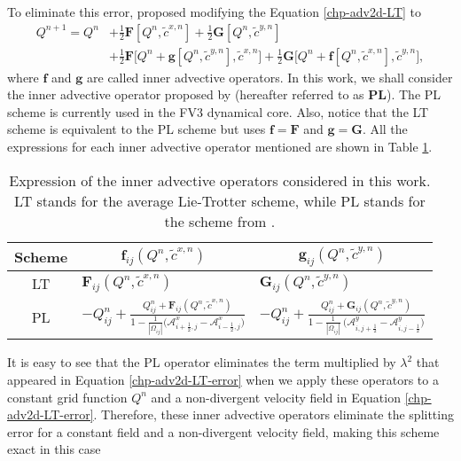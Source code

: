 To eliminate this error, \citet{lin:1996} proposed modifying the Equation \eqref{chp-adv2d-LT} to
\begin{align}
\label{chp-adv2d-PL}
Q^{n+1} = Q^n &+ \frac{1}{2}\mathbf{F}[Q^n,\tilde{c}^{x,n}] + \frac{1}{2}\mathbf{G}[Q^n,\tilde{c}^{y,n}]\nonumber \\
&+\frac{1}{2}\mathbf{F}\bigg[Q^n + \mathbf{g}[Q^n, \tilde{c}^{y,n}], \tilde{c}^{x,n}\bigg]+
\frac{1}{2}\mathbf{G}\bigg[Q^n + \mathbf{f}[Q^n, \tilde{c}^{x,n}], \tilde{c}^{y,n}\bigg],
\end{align}
where $\mathbf{f}$ and $\mathbf{g}$ are called inner advective operators.
In this work, we shall consider the inner advective operator proposed by \citet{putman:2007} (hereafter referred to as \textbf{PL}).
The PL scheme is currently used in the FV3 dynamical core. Also, notice that the LT scheme is equivalent to the PL scheme but uses 
$\mathbf{f}=\mathbf{F}$ and $\mathbf{g}=\mathbf{G}$.
All the expressions for each inner advective operator mentioned are shown in Table \ref{chp-adv2d-tab1}.
\begin{table}[!h]
	\begin{tabular}{|c|l|l|}
		\hline
		Scheme & \multicolumn{1}{c|}{$\mathbf{f}_{ij}(Q^n, \tilde{c}^{x,n})$}
		       & \multicolumn{1}{c|}{$\mathbf{g}_{ij}(Q^n, \tilde{c}^{y,n})$} \\ \hline
		LT   & $\mathbf{F}_{ij}(Q^n,\tilde{c}^{x,n})$ 
		       & $\mathbf{G}_{ij}(Q^n,\tilde{c}^{y,n})$ \\ \hline
		PL   & $-Q_{ij}^n +
		         \frac{Q_{ij}^n  + \mathbf{F}_{ij}(Q^n,\tilde{c}^{x,n})}
			   {1 - \frac{1}{|\Omega_{ij}|}\big(\mathcal{A}_{i+\frac{1}{2},j}^{x} - \mathcal{A}_{i-\frac{1}{2},j}^{x}\big)}$
			   & $-Q_{ij}^n +
			 \frac{Q_{ij}^n  + \mathbf{G}_{ij}(Q^n,\tilde{c}^{y,n})}
			   {1 - \frac{1}{|\Omega_{ij}|}\ \big(\mathcal{A}_{i,j+\frac{1}{2}}^{y} - \mathcal{A}_{i,j-\frac{1}{2}}^{y}\big)}$
			   \\ \hline
	\end{tabular}
\caption{Expression of the inner advective operators considered in this work.
LT stands for the average Lie-Trotter  scheme, while PL stands for the scheme from \citet{putman:2007}.}
\label{chp-adv2d-tab1}
\end{table}
It is easy to see that the PL operator eliminates the term multiplied by $\lambda^2$ that appeared in Equation \eqref{chp-adv2d-LT-error}
when we apply these operators to a constant grid function $Q^n$ and a non-divergent velocity field in Equation \eqref{chp-adv2d-LT-error}.
Therefore, these inner advective operators eliminate the splitting error for a constant field and a non-divergent velocity field, making this scheme exact in this case
